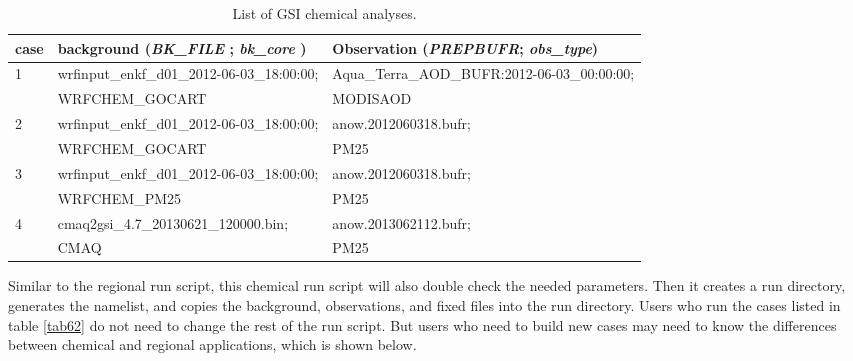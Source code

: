 \begin{table}[htbp]
\centering
\begin{footnotesize}
\caption{List of GSI chemical analyses.}
\begin{tabular}{|p{0.7cm}|p{7cm}|p{7cm}|}
\hline
case&background (\textit{BK\_FILE} ; \textit{bk\_core} ) & Observation (\textit{PREPBUFR}; \textit{obs\_type})\\
\hline
1&wrfinput\_enkf\_d01\_2012-06-03\_18:00:00;  & Aqua\_Terra\_AOD\_BUFR:2012-06-03\_00:00:00;  \\
&WRFCHEM\_GOCART &  MODISAOD \\
\hline
2&wrfinput\_enkf\_d01\_2012-06-03\_18:00:00;  & anow.2012060318.bufr; \\
 & WRFCHEM\_GOCART &  PM25\\
\hline
3&wrfinput\_enkf\_d01\_2012-06-03\_18:00:00; & anow.2012060318.bufr; \\
& WRFCHEM\_PM25&  PM25 \\
\hline
4&cmaq2gsi\_4.7\_20130621\_120000.bin;  & anow.2013062112.bufr; \\
& CMAQ & PM25\\
\hline
\end{tabular}
\label{tab63}
\end{footnotesize}
\end{table} 
Similar to the regional run script, this chemical run script will also double check the needed parameters. Then it creates a run directory, generates the namelist, and copies the background, observations, and fixed files into the run directory. Users who run the cases listed in table \ref{tab62} do not need to change the rest of the run script. But users who need to build new cases may need to know the differences between chemical and regional applications, which is shown below.  


